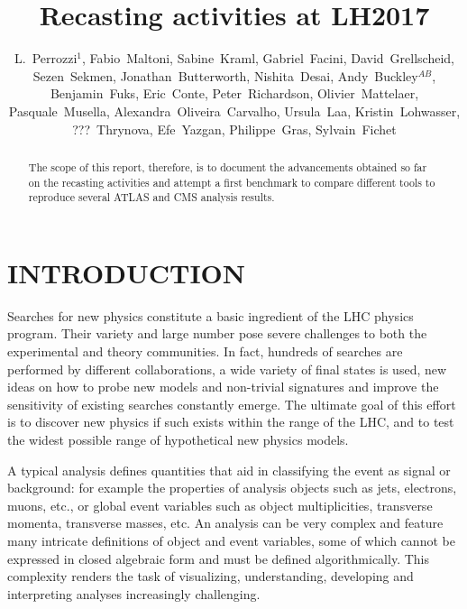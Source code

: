 \documentclass[11pt]{cernrep}
\begin{document}
\setlength\parindent{0pt}

\title{Recasting activities at LH2017}

\author{L.~Perrozzi$^1$, Fabio~Maltoni, Sabine~Kraml, Gabriel~Facini, David~Grellscheid, Sezen~Sekmen,
  Jonathan~Butterworth, Nishita~Desai, Andy~Buckley$^{AB}$, Benjamin~Fuks, Eric~Conte, Peter~Richardson,
  Olivier~Mattelaer, Pasquale~Musella, Alexandra~Oliveira~Carvalho, Ursula~Laa, Kristin~Lohwasser,
  ???~Thrynova, Efe~Yazgan, Philippe~Gras, Sylvain~Fichet}


\maketitle

\begin{abstract}
The scope of this report, therefore, is to document the advancements obtained so far on the recasting
activities and attempt a first benchmark to compare different tools to reproduce several ATLAS and
CMS analysis results.
\end{abstract}

\section{INTRODUCTION}

Searches for new physics constitute a basic ingredient of the LHC physics program.
Their variety and large number pose severe challenges to both the experimental and theory communities.
In fact, hundreds of searches are performed by different collaborations, a wide variety of final states is used,
new ideas on how to probe new models and non-trivial signatures and improve the sensitivity of existing searches constantly emerge.
The ultimate goal of this effort is to discover new physics if such
exists within the range of the LHC, and to test the widest possible range of hypothetical new physics models.

A typical analysis defines quantities that aid in classifying the event as signal or background: for example
the properties of analysis objects such as jets, electrons, muons, etc., or global event variables
such as object multiplicities, transverse momenta, transverse masses, etc.
An analysis can be very complex and feature many intricate definitions of object and event
variables, some of which cannot be expressed in closed algebraic form and must be defined
algorithmically. This complexity renders the task of visualizing, understanding, developing and
interpreting analyses increasingly challenging.
\end{document}
